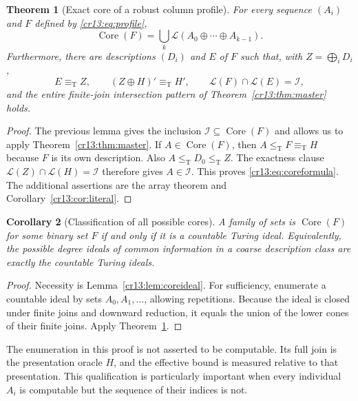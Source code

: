 \documentclass[11pt,letterpaper]{article}
\newtheorem{theorem}{Theorem}[section]
\newtheorem{corollary}[theorem]{Corollary}
\theoremstyle{definition}
\theoremstyle{remark}\newtheorem{remark}[theorem]{Remark}
\numberwithin{equation}{section}
\newcommand{\leT}{\leq_{\mathrm T}}
\newcommand{\eqT}{\equiv_{\mathrm T}}
\newcommand{\Low}{\mathcal L}
\newcommand{\Core}{\operatorname{Core}}
\newcommand{\Ideal}{\mathcal I}
\begin{document}
\begin{theorem}[Exact core of a robust column profile]\label{cr13:thm:profilecore}
For every sequence $(A_i)$ and $F$ defined by \eqref{cr13:eq:profile},
\begin{equation}\label{cr13:eq:coreformula}
 \Core(F)=\bigcup_k\Low(A_0\oplus\cdots\oplus A_{k-1}).
\end{equation}
Furthermore, there are descriptions $(D_i)$ and $E$ of $F$ such that, with $Z=\bigoplus_iD_i$,
\[
 E\eqT Z,\qquad (Z\oplus H)'\eqT H',\qquad
 \Low(F)\cap\Low(E)=\Ideal,
\]
and the entire finite-join intersection pattern of Theorem~\ref{cr13:thm:master} holds.
\end{theorem}
\begin{proof}
The previous lemma gives the inclusion $\Ideal\subseteq\Core(F)$ and allows us to apply Theorem~\ref{cr13:thm:master}. If $A\in\Core(F)$, then $A\leT F\eqT H$ because $F$ is its own description. Also $A\leT D_0\leT Z$. The exactness clause $\Low(Z)\cap\Low(H)=\Ideal$ therefore gives $A\in\Ideal$. This proves \eqref{cr13:eq:coreformula}. The additional assertions are the array theorem and Corollary~\ref{cr13:cor:literal}.
\end{proof}

\begin{corollary}[Classification of all possible cores]\label{cr13:cor:allcores}
A family of sets is $\Core(F)$ for some binary set $F$ if and only if it is a countable Turing ideal. Equivalently, the possible degree ideals of common information in a coarse description class are exactly the countable Turing ideals.
\end{corollary}
\begin{proof}
Necessity is Lemma~\ref{cr13:lem:coreideal}. For sufficiency, enumerate a countable ideal by sets $A_0,A_1,\ldots$, allowing repetitions. Because the ideal is closed under finite joins and downward reduction, it equals the union of the lower cones of their finite joins. Apply Theorem~\ref{cr13:thm:profilecore}.
\end{proof}
The enumeration in this proof is not asserted to be computable. Its full join is the presentation oracle $H$, and the effective bound is measured relative to that presentation. This qualification is particularly important when every individual $A_i$ is computable but the sequence of their indices is not.
\end{document}
